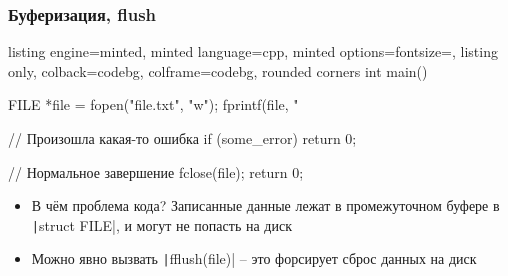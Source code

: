 \documentclass[10pt]{beamer}
\begin{document}
\begin{frame}[fragile]
\frametitle{Буферизация, flush}
\begin{tcblisting}{listing engine=minted, minted language=cpp, minted options={fontsize=\scriptsize}, listing only, colback=codebg, colframe=codebg, rounded corners}
int main() {
  FILE *file = fopen("file.txt", "w");
  fprintf(file, "%

  // Произошла какая-то ошибка
  if (some_error) {
    return 0;
  }

  // Нормальное завершение
  fclose(file);
  return 0;
}
\end{tcblisting}
\begin{itemize}
\item В чём проблема кода? \pause Записанные данные лежат в промежуточном буфере в \texttt|struct FILE|, и могут не попасть на диск
\pause
\item Можно явно вызвать \texttt|fflush(file)| -- это форсирует сброс данных на диск
\end{itemize}
\end{frame}
\end{document}
